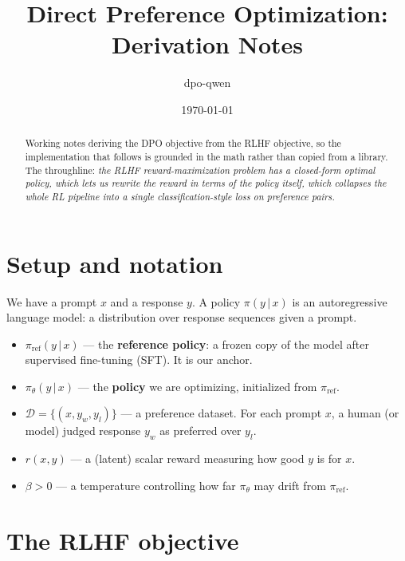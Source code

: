 \documentclass[11pt]{article}
\title{Direct Preference Optimization: Derivation Notes}
\author{dpo-qwen}
\date{\today}
\newcommand{\D}{\mathcal{D}}
\newcommand{\given}{\,\vert\,}
\newcommand{\pol}{\pi_{\theta}}          %
\newcommand{\piref}{\pi_{\mathrm{ref}}}  %
\newcommand{\yw}{y_w}                     %
\newcommand{\yl}{y_l}                     %
\begin{document}
\maketitle

\begin{abstract}
Working notes deriving the DPO objective from the RLHF objective, so the
implementation that follows is grounded in the math rather than copied from a
library. The throughline: \emph{the RLHF reward-maximization problem has a
closed-form optimal policy, which lets us rewrite the reward in terms of the
policy itself, which collapses the whole RL pipeline into a single
classification-style loss on preference pairs.}
\end{abstract}

\tableofcontents

\section{Setup and notation}

We have a prompt $x$ and a response $y$. A policy $\pi(y \given x)$ is an
autoregressive language model: a distribution over response sequences given a
prompt.

\begin{itemize}
  \item $\piref(y \given x)$ — the \textbf{reference policy}: a frozen copy of the
        model after supervised fine-tuning (SFT). It is our anchor.
  \item $\pol(y \given x)$ — the \textbf{policy} we are optimizing, initialized
        from $\piref$.
  \item $\D = \{(x, \yw, \yl)\}$ — a preference dataset. For each prompt $x$, a
        human (or model) judged response $\yw$ as preferred over $\yl$.
  \item $r(x, y)$ — a (latent) scalar reward measuring how good $y$ is for $x$.
  \item $\beta > 0$ — a temperature controlling how far $\pol$ may drift from
        $\piref$.
\end{itemize}

\section{The RLHF objective}
\end{document}
